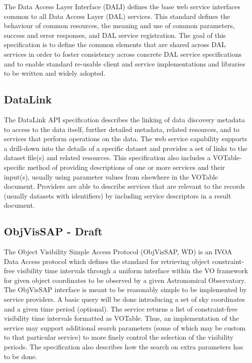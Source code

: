 \documentclass[11pt,a4paper]{ivoa}
\begin{document}
The Data Access Layer Interface (DALI) \citep{2017ivoa.spec.0517D} defines the base web service interfaces common to all Data 
Access Layer (DAL) services. This standard defines the behaviour of common resources, the 
meaning and use of common parameters, success and error responses, and DAL service 
registration. The goal of this specification is to define the common elements that are 
shared across DAL services in order to foster consistency across concrete DAL service 
specifications and to enable standard re-usable client and service implementations and 
libraries to be written and widely adopted. 

\subsection{DataLink}

The DataLink \citep{2015ivoa.spec.0617D} API specification describes the linking of data discovery metadata to access to 
the data itself, further detailed metadata, related resources, and to services that perform 
operations on the data. The web service capability supports a drill-down into the details 
of a specific dataset and provides a set of links to the dataset file(s) and related resources. 
This specification also includes a VOTable-specific method of providing descriptions of one 
or more services and their input(s), usually using parameter values from elsewhere in the 
VOTable document. Providers are able to describe services that are relevant to the records 
(usually datasets with identifiers) by including service descriptors in a result document. 

\subsection{ObjVisSAP - Draft}

The Object Visibility Simple Access Protocol (ObjVisSAP, WD) is an IVOA Data Access protocol 
which defines the standard for retrieving object constraint-free visibility time intervals 
through a uniform interface within the VO framework for given object coordinates to be 
observed by a given Astronomical Observatory. The ObjVisSAP interface is meant to be 
reasonably simple to be implemented by service providers. A basic query will be done 
introducing a set of sky coordinates and a given time period (optional). The service 
returns a list of constraint-free visibility time intervals formatted as VOTable. Thus, 
an implementation of the service may support additional search parameters (some of which 
may be custom to that particular service) to more finely control the selection of the 
visibility periods. The specification also describes how the search on extra parameters 
has to be done.
\end{document}
